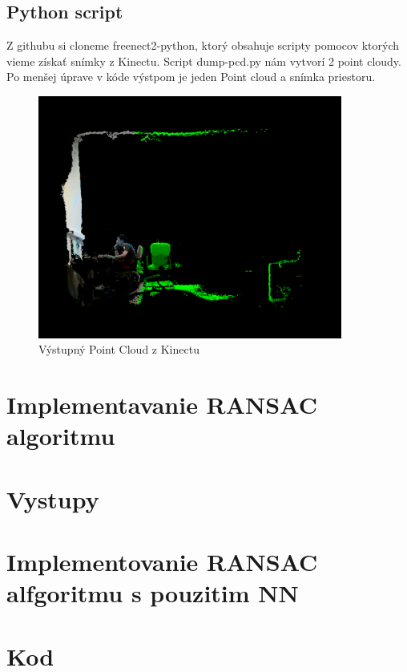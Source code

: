 \subsection{Python script}
Z githubu si cloneme freenect2-python, ktorý obsahuje scripty pomocov ktorých vieme získať snímky z Kinectu. Script dump-pcd.py nám vytvorí 2 point cloudy. Po menšej úprave v kóde výstpom je jeden Point cloud a snímka priestoru.
\begin{figure}[!htbp]
  \centering
  \includegraphics[width=10cm]{img/output_kinect.png}
  \caption{Výstupný Point Cloud z Kinectu}
  \label{vzhladobr}
\end{figure}
\section{Implementavanie RANSAC algoritmu}
\section{Vystupy}
\section{Implementovanie RANSAC alfgoritmu s pouzitim NN}
\section{Kod}

